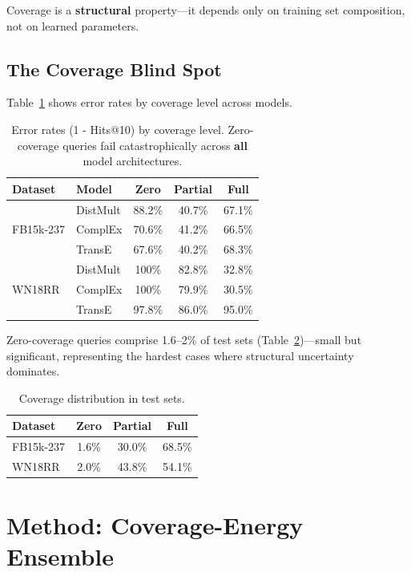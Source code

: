\documentclass{article}
\begin{document}
Coverage is a \textbf{structural} property---it depends only on training set composition, not on learned parameters.

\subsection{The Coverage Blind Spot}

Table~\ref{tab:blindspot} shows error rates by coverage level across models.

\begin{table}[h]
\centering
\caption{Error rates (1 - Hits@10) by coverage level. Zero-coverage queries fail catastrophically across \textbf{all} model architectures.}
\label{tab:blindspot}
\begin{tabular}{llccc}
\toprule
Dataset & Model & Zero & Partial & Full \\
\midrule
\multirow{3}{*}{FB15k-237}
& DistMult & 88.2\% & 40.7\% & 67.1\% \\
& ComplEx & 70.6\% & 41.2\% & 66.5\% \\
& TransE & 67.6\% & 40.2\% & 68.3\% \\
\midrule
\multirow{3}{*}{WN18RR}
& DistMult & 100\% & 82.8\% & 32.8\% \\
& ComplEx & 100\% & 79.9\% & 30.5\% \\
& TransE & 97.8\% & 86.0\% & 95.0\% \\
\bottomrule
\end{tabular}
\end{table}

Zero-coverage queries comprise 1.6--2\% of test sets (Table~\ref{tab:prevalence})---small but significant, representing the hardest cases where structural uncertainty dominates.

\begin{table}[h]
\centering
\caption{Coverage distribution in test sets.}
\label{tab:prevalence}
\begin{tabular}{lccc}
\toprule
Dataset & Zero & Partial & Full \\
\midrule
FB15k-237 & 1.6\% & 30.0\% & 68.5\% \\
WN18RR & 2.0\% & 43.8\% & 54.1\% \\
\bottomrule
\end{tabular}
\end{table}

\section{Method: Coverage-Energy Ensemble}
\label{sec:method}
\end{document}
